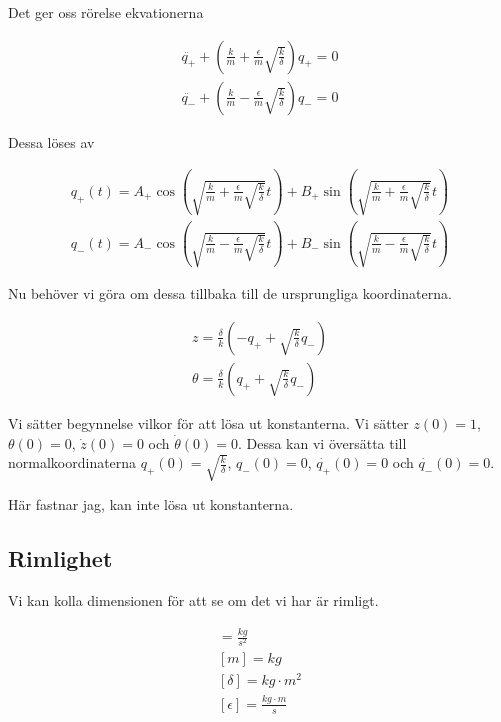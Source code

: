 \documentclass[a4paper]{article}
\begin{document}
Det ger oss rörelse ekvationerna

\begin{align*}
    \ddot{q_+} + \left ( \frac{k}{m} + \frac{\epsilon}{m}\sqrt{\frac{k}{\delta}} \right ) q_+ = 0 \\
    \ddot{q_-} + \left ( \frac{k}{m} - \frac{\epsilon}{m}\sqrt{\frac{k}{\delta}} \right ) q_- = 0
\end{align*}

Dessa löses av

\begin{align*}
    q_+(t) = A_+ \cos \left ( \sqrt{\frac{k}{m} + \frac{\epsilon}{m}\sqrt{\frac{k}{\delta}}} t \right ) + B_+ \sin \left ( \sqrt{\frac{k}{m} + \frac{\epsilon}{m}\sqrt{\frac{k}{\delta}}} t \right ) \\
    q_-(t) = A_- \cos \left ( \sqrt{\frac{k}{m} - \frac{\epsilon}{m}\sqrt{\frac{k}{\delta}}} t \right ) + B_- \sin \left ( \sqrt{\frac{k}{m} - \frac{\epsilon}{m}\sqrt{\frac{k}{\delta}}} t \right )
\end{align*}

Nu behöver vi göra om dessa tillbaka till de ursprungliga koordinaterna. 

\begin{align*}
    z = \frac{\delta}{k} \left ( -q_+ + \sqrt{\frac{k}{\delta}} q_- \right ) \\
    \theta = \frac{\delta}{k} \left ( q_+ + \sqrt{\frac{k}{\delta}} q_- \right )
\end{align*}

Vi sätter begynnelse vilkor för att lösa ut konstanterna. Vi sätter $z(0) = 1$, $\theta(0) = 0$, $\dot{z}(0) = 0$ och $\dot{\theta}(0) = 0$. Dessa kan vi översätta till normalkoordinaterna $q_+(0) = \sqrt{\frac{k}{\delta}}$, $q_-(0) = 0$, $\dot{q_+}(0) = 0$ och $\dot{q_-}(0) = 0$. 

Här fastnar jag, kan inte lösa ut konstanterna.

\subsection{Rimlighet}

Vi kan kolla dimensionen för att se om det vi har är rimligt.

\begin{align*}
    [k] = \frac{kg}{s^2} \\
    [m] = kg \\
    [\delta] = kg \cdot m^2 \\
    [\epsilon] = \frac{kg\cdot m}{s}
\end{align*}
\end{document}

